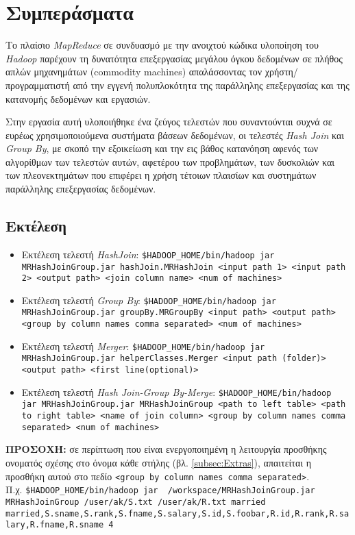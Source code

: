 \documentclass{article}
\newcommand{\en}[1]{\foreignlanguage{english}{#1}}
\begin{document}
\section{Συμπεράσματα} \label{sec:Eval}

Το πλαίσιο \emph{\en{MapReduce}} σε συνδυασμό με την ανοιχτού κώδικα υλοποίηση του \emph{\en{Hadoop}} παρέχουν τη δυνατότητα επεξεργασίας μεγάλου όγκου δεδομένων σε πλήθος απλών μηχανημάτων (\en{commodity machines}) απαλάσσοντας τον χρήστη/προγραμματιστή από την εγγενή πολυπλοκότητα της παράλληλης επεξεργασίας και της κατανομής δεδομένων και εργασιών.

Στην εργασία αυτή υλοποιήθηκε ένα ζεύγος τελεστών που συναντούνται συχνά σε ευρέως χρησιμοποιούμενα συστήματα βάσεων δεδομένων, οι τελεστές \emph{\en{Hash Join}} και \emph{\en{Group By}}, με σκοπό την εξοικείωση και την εις βάθος κατανόηση αφενός των αλγορίθμων των τελεστών αυτών, αφετέρου των προβλημάτων, των δυσκολιών και των πλεονεκτημάτων που επιφέρει η χρήση τέτοιων πλαισίων και συστημάτων παράλληλης επεξεργασίας δεδομένων.

\newpage
\begin{appendices}
\section{Εκτέλεση} \label{app:Running}
\begin{itemize}
\item Εκτέλεση τελεστή \emph{\en{HashJoin}}: \texttt{\en{\$HADOOP\_HOME/bin/hadoop jar MRHashJoinGroup.jar hashJoin.MRHashJoin <input path 1> <input path 2> <output path> <join column name> <num of machines>}}

\item Εκτέλεση τελεστή \emph{\en{Group By}}: \texttt{\en{\$HADOOP\_HOME/bin/hadoop jar MRHashJoinGroup.jar groupBy.MRGroupBy  <input path> <output path> <group by column names comma separated> <num of machines>}}

\item Εκτέλεση τελεστή \emph{\en{Merger}}: \texttt{\en{\$HADOOP\_HOME/bin/hadoop jar MRHashJoinGroup.jar helperClasses.Merger <input path (folder)> <output path> <first line(optional)>}}

\item Εκτέλεση τελεστή \emph{\en{Hash Join-Group By-Merge}}: \texttt{\en{\$HADOOP\_HOME/bin/hadoop jar MRHashJoinGroup.jar MRHashJoinGroup <path to left table> <path to right table> <name of join column> <group by column names comma separated> <num of machines>}}
\end{itemize}
\textbf{ΠΡΟΣΟΧΉ:} σε περίπτωση που είναι ενεργοποιημένη η λειτουργία προσθήκης ονοματός σχέσης στο όνομα κάθε στήλης (βλ. \ref{subsec:Extras}), απαιτείται η προσθήκη αυτού στο πεδίο \texttt{\en{<group by column names comma separated>}}. \\ Π.χ. \texttt{\en{\$HADOOP\_HOME/bin/hadoop jar ~/workspace/MRHashJoinGroup.jar MRHashJoinGroup /user/ak/S.txt /user/ak/R.txt married \\ married,S.sname,S.rank,S.fname,S.salary,S.id,S.foobar,R.id,R.rank,R.salary,R.fname,R.sname 4}}\\
\end{appendices}
\end{document}
